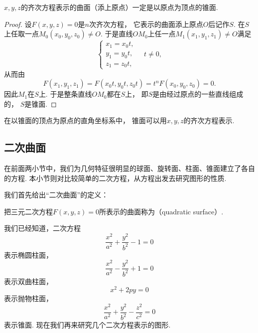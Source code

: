 \begin{theorem}
\(x,y,z\)的齐次方程表示的曲面（添上原点）一定是以原点为顶点的锥面.
\begin{proof}
设\(F(x,y,z)=0\)是\(n\)次齐次方程，
它表示的曲面添上原点\(O\)后记作\(S\).
在\(S\)上任取一点\(M_0(x_0,y_0,z_0) \neq O\).
于是直线\(O M_0\)上任一点\(M_1(x_1,y_1,z_1) \neq O\)满足\[
	\left\{ \begin{array}{l}
		x_1 = x_0 t, \\
		y_1 = y_0 t, \\
		z_1 = z_0 t,
	\end{array} \right.
	\quad t \neq 0,
\]
从而由\[
	F(x_1,y_1,z_1) = F(x_0 t,y_0 t,z_0 t)
	= t^n F(x_0,y_0,z_0) = 0.
\]
因此\(M_1\)在\(S\)上.
于是整条直线\(O M_0\)都在\(S\)上，
即\(S\)是由经过原点的一些直线组成的，
\(S\)是锥面.
\end{proof}
\end{theorem}

\begin{theorem}
在以锥面的顶点为原点的直角坐标系中，
锥面可以用\(x,y,z\)的齐次方程表示.
\end{theorem}

\subsection{二次曲面}
在前面两小节中，我们为几何特征很明显的球面、旋转面、柱面、锥面建立了各自的方程.
本小节则对比较简单的二次方程，从方程出发去研究图形的性质.

我们首先给出“二次曲面”的定义：
\begin{definition}
把三元二次方程\(F(x,y,z)=0\)所表示的曲面称为（quadratic surface）.
\end{definition}

我们已经知道，二次方程\[
	\frac{x^2}{a^2}+\frac{y^2}{b^2}-1=0
\]表示椭圆柱面，
\[
	\frac{x^2}{a^2}-\frac{y^2}{b^2}+1=0
\]表示双曲柱面，
\[
	x^2+2py=0
\]表示抛物柱面，
\[
	\frac{x^2}{a^2}+\frac{y^2}{b^2}-\frac{z^2}{c^2}=0
\]表示锥面.
现在我们再来研究几个二次方程表示的图形.

